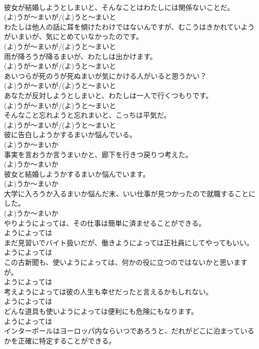 \documentclass[8pt]{extreport}
\begin{document}
\begin{CJK}{UTF8}{min}
\\	彼女が結婚しようとしまいと、そんなことはわたしには関係ないことだ。	
\\	(よ)うが～まいが/(よ)うと～まいと
\\	わたしは他人の話に耳を傾けたわけではないんですが、むこうはきかれていようがいまいが、気にとめていなかったのです。	
\\	(よ)うが～まいが/(よ)うと～まいと
\\	雨が降ろうが降るまいが、わたしは出かけます。	
\\	(よ)うが～まいが/(よ)うと～まいと
\\	あいつらが死のうが死ぬまいが気にかける人がいると思うかい？	
\\	(よ)うが～まいが/(よ)うと～まいと
\\	あなたが反対しようとしまいと、わたしは一人で行くつもりです。	
\\	(よ)うが～まいが/(よ)うと～まいと
\\	そんなこと忘れようと忘れまいと、こっちは平気だ。	
\\	(よ)うが～まいが/(よ)うと～まいと
\\	彼に告白しようかするまいか悩んでいる。	
\\	(よ)うか～まいか
\\	事実を言おうか言うまいかと、廊下を行きつ戻りつ考えた。	
\\	(よ)うか～まいか
\\	彼女と結婚しようかするまいか悩んでいます。	
\\	(よ)うか～まいか
\\	大学に入ろうか入るまいか悩んだ末、いい仕事が見つかったので就職することにした。	
\\	(よ)うか～まいか
\\	やりようによっては、その仕事は簡単に済ませることができる。	
\\	ようによっては
\\	まだ見習いでバイト扱いだが、働きようによっては正社員にしてやってもいい。	
\\	ようによっては
\\	この古新聞も、使いようによっては、何かの役に立つのではないかと思いますが。	
\\	ようによっては
\\	考えようによっては彼の人生も幸せだったと言えるかもしれない。	
\\	ようによっては
\\	どんな道具も使いようによっては便利にも危険にもなります。	
\\	ようによっては
\\	インターポールはヨーロッパ内ならいつであろうと、だれがどこに泊まっているかを正確に特定することができる。	

\end{CJK}
\end{document}
